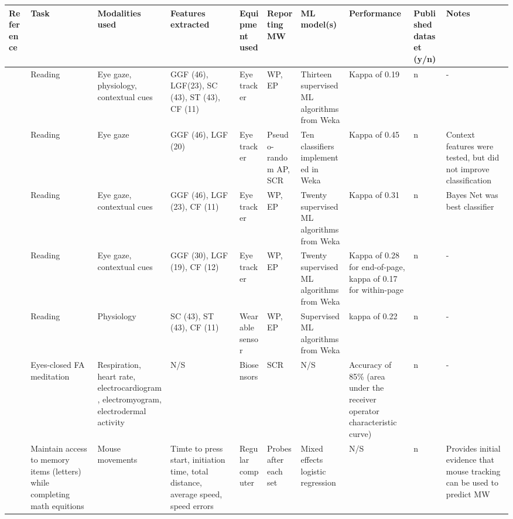 \begin{landscape}
\begin{xtabular}{p{25mm}p{25mm}p{30mm}p{18mm}p{32mm}p{22mm}p{2cm}p{2cm}p{15mm}p{32cm}}
  \toprule
  Reference & Task & Modalities used & Features extracted & Equipment used & Reporting MW & ML model(s) & Performance & Published dataset (y/n) & Notes \\
  \midrule
  \cite{Bixler2015AutomaticPhysiology}   &  Reading 	& Eye gaze, physiology, contextual cues & GGF (46), LGF(23), SC (43), ST (43), CF (11)  & Eye tracker   & WP, EP  &  Thirteen supervised ML algorithms from Weka        & Kappa of 0.19 & n & -\\\hline
  \cite{Bixler2015AutomaticAwareness}     &  Reading  & Eye gaze                              & GGF (46), LGF (20)                            & Eye tracker   & Pseudo-random AP, SCR  &  Ten classifiers implemented in Weka & Kappa of 0.45 & n & Context features were tested, but did not improve classification\\\hline
  \cite{Bixler2016AutomaticReading}       &  Reading 	& Eye gaze, contextual cues             & GGF (46), LGF (23), CF (11)                   & Eye tracker   & WP, EP & Twenty supervised ML algorithms from Weka            & Kappa of 0.31 & n & Bayes Net was best classifier\\\hline
  \cite{Bixler2014TowardWandering}        &  Reading  & Eye gaze, contextual cues             & GGF (30), LGF (19), CF (12)                   & Eye tracker   & WP, EP & Twenty supervised ML algorithms from Weka            & Kappa of 0.28 for end-of-page, kappa of 0.17 for within-page & n & -\\\hline
  \cite{Blanchard2014AutomatedLearning}   &  Reading	& Physiology                                                                                            & SC (43), ST (43), CF (11)                                                          & Wearable sensor & WP, EP                                     & Supervised ML algorithms from Weka & kappa of 0.22 & n & -\\\hline
  \cite{Cheetham2016AutomatedApplication} &  Eyes-closed FA meditation  	& Respiration, heart rate, electrocardiogram, electromyogram, electrodermal activity & N/S                                                                               & Biosensors  &  SCR                                           & N/S & Accuracy of 85\% (area under the receiver operator characteristic curve) & n & -\\\hline
  \cite{DaSilva2018WanderingWandering}   &  Maintain access to memory items (letters) while completing math equitions & Mouse movements                      & Timte to press start, initiation time, total distance, average speed, speed errors & Regular computer & Probes after each set                     & Mixed effects logistic regression & N/S & n & Provides initial evidence that mouse tracking can be used to predict MW\\\hline

\end{xtabular}
\end{landscape}
